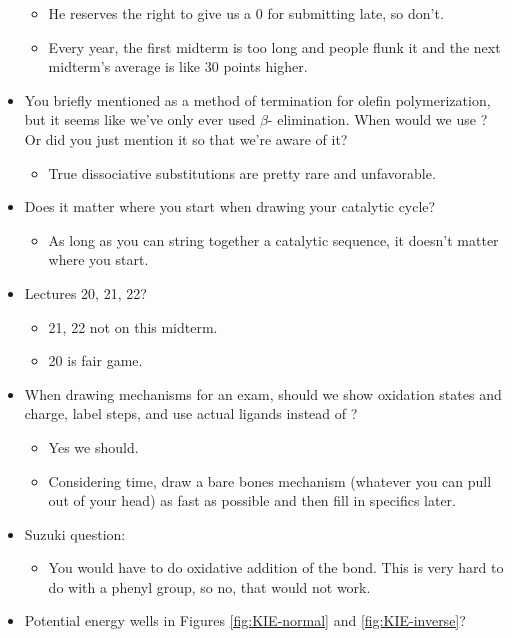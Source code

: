 \documentclass[../notes.tex]{subfiles}
\begin{document}
\begin{itemize}
\begin{itemize}
        \item He reserves the right to give us a 0 for submitting late, so don't.
        \item Every year, the first midterm is too long and people flunk it and the next midterm's average is like 30 points higher.
    \end{itemize}
    \item You briefly mentioned  as a method of termination for olefin polymerization, but it seems like we've only ever used $\beta$- elimination. When would we use ? Or did you just mention it so that we're aware of it?
    \begin{itemize}
        \item True dissociative substitutions are pretty rare and unfavorable.
    \end{itemize}
    \item Does it matter where you start when drawing your catalytic cycle?
    \begin{itemize}
        \item As long as you can string together a catalytic sequence, it doesn't matter where you start.
    \end{itemize}
    \item Lectures 20, 21, 22?
    \begin{itemize}
        \item 21, 22 not on this midterm.
        \item 20 is fair game.
    \end{itemize}
    \item When drawing mechanisms for an exam, should we show oxidation states and charge, label steps, and use actual ligands instead of ?
    \begin{itemize}
        \item Yes we should.
        \item Considering time, draw a bare bones mechanism (whatever you can pull out of your head) as fast as possible and then fill in specifics later.
    \end{itemize}
    \item Suzuki question:
    \begin{itemize}
        \item You would have to do oxidative addition of the  bond. This is very hard to do with a phenyl group, so no, that would not work.
    \end{itemize}
    \item Potential energy wells in Figures \ref{fig:KIE-normal} and \ref{fig:KIE-inverse}?

\end{itemize}
\end{document}
